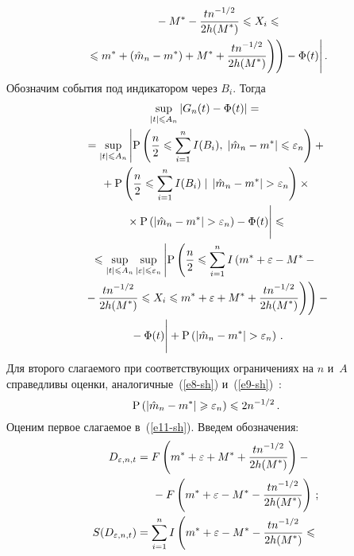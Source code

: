 \begin{multicols}{2}
\noindent
\begin{multline*}
\hspace*{8mm}\left.\left.\left.{}-M^*-\displaystyle\frac{\displaystyle tn^{-1/2}\mathstrut}{\displaystyle 2h(M^*)\mathstrut}\leqslant X_i\leqslant{}\right.\right.\right.\\
\!\left.\left.\left.{}\leqslant
 m^*+(\hat{m}_n-m^*)+M^*+\displaystyle\frac{\displaystyle tn^{-1/2}\mathstrut}{\displaystyle 2h(M^*)\mathstrut}\right)\right)-\Phi(t)\right|.
 \end{multline*}
Обозначим события под индикатором через $B_i$. Тогда
\begin{multline}
\sup\limits_{\abs{t}\leqslant A_n}\abs{G_n(t)-\Phi(t)}={}\\
{}=\sup\limits_{\abs{t}\leqslant A_n}\left|\mbox{P}\left(
\fr{n}{2}\leqslant\sum\limits_{i=1}^{n}I(B_i), 
\;\abs{\hat{m}_n-m^*}\leqslant\eps_n\right)+{}\right.\\
\left.{}+\mbox{P}\left(\fr{n}{2}\leqslant\sum\limits_{i=1}^{n}I(B_i)\;| \;
\abs{\hat{m}_n-m^*}>\eps_n\right)\times{}\right.\\
\left.{}\times \mbox{P}\left(\abs{\hat{m}_n-m^*}>\eps_n\right)-\Phi(t)
\vphantom{\sum\limits_{i=1}^n}\right|\leqslant{}\\
{}\leqslant\sup\limits_{\abs{t}\leqslant A_n}
\sup\limits_{\abs{\eps}\leqslant \eps_n}\left|\mbox{P}\left(\fr{n}{2}
\leqslant\sum\limits_{i=1}^{n}I\left(m^*+\eps-M^*-{}\right.\right.\right.\\
\left.\left.\left.{}-\fr{tn^{-1/2}}{2h(M^*)}\leqslant
 X_i\leqslant m^*+\eps+M^*+\fr{tn^{-1/2}}{2h(M^*)}\right)\right)-{}\right.\\
\left. {}-\Phi(t)
\vphantom{\sum\limits^n_{i=1}}\right|+\mbox{P}\left(\abs{\hat{m}_n-m^*}>\eps_n\right)\,.
\label{e11-sh}
\end{multline}
Для второго слагаемого при соответствующих ограничениях на $n$ и~$A$ 
справедливы оценки, аналогичные~(\ref{e8-sh}) и~(\ref{e9-sh})~\cite{5-sh}:
\begin{equation}
\mbox{P}\left(\left\vert\hat{m}_n-m^*\right\vert\geqslant\varepsilon_n\right)\leqslant2n^{-1/2}\,.
\label{e12-sh}
\end{equation}
Оценим первое слагаемое в~(\ref{e11-sh}). Введем обозначения:
\begin{align*}
D_{\eps,n,t}&=F\left(m^*+\eps+M^*+\fr{tn^{-1/2}}{2h(M^*)}\right)-{}\\
&\hspace*{5mm}{}-F\left(m^*+\eps-M^*-\fr{tn^{-1/2}}{2h(M^*)}\right)\,;
\\
S(D_{\eps,n,t})&=\sum\limits_{i=1}^{n}I\left(m^*+\eps-M^*-
\fr{tn^{-1/2}}{2h(M^*)}\leqslant {}\right.\\

\end{align*}
\end{multicols}
